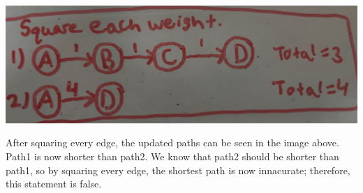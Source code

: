 \documentclass[11pt]{article}
\begin{document}
\begin{center}
\includegraphics[keepaspectratio=true,scale=0.25]{updated_paths2.jpg}
\end{center}
After squaring every edge, the updated paths can be seen in the image above. Path1 is now shorter than path2. We know that path2 should be shorter than path1, so by squaring every edge, the shortest path is now innacurate; therefore, this statement is false.
\end{document}
